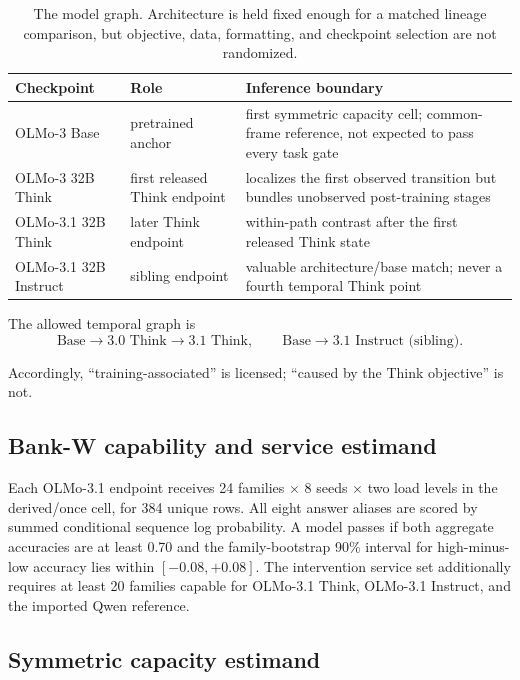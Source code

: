\documentclass[11pt]{article}
\begin{document}
\begin{table}[H]
\centering\small
\begin{tabularx}{\textwidth}{@{}p{}p{}X@{}}
\toprule
\textbf{Checkpoint} & \textbf{Role} & \textbf{Inference boundary}\\
\midrule
OLMo-3 Base & pretrained anchor & first symmetric capacity cell; common-frame
reference, not expected to pass every task gate\\
OLMo-3 32B Think & first released Think endpoint & localizes the first observed
transition but bundles unobserved post-training stages\\
OLMo-3.1 32B Think & later Think endpoint & within-path contrast after the first
released Think state\\
OLMo-3.1 32B Instruct & sibling endpoint & valuable architecture/base match;
never a fourth temporal Think point\\
\bottomrule
\end{tabularx}
\caption{The model graph. Architecture is held fixed enough for a matched
lineage comparison, but objective, data, formatting, and checkpoint selection
are not randomized.}
\end{table}

The allowed temporal graph is
\[
\text{Base}\longrightarrow\text{3.0 Think}\longrightarrow\text{3.1 Think},
\qquad
\text{Base}\longrightarrow\text{3.1 Instruct (sibling)}.
\]

Accordingly, ``training-associated'' is licensed; ``caused by the Think
objective'' is not.

\subsection{Bank-W capability and service estimand}

Each OLMo-3.1 endpoint receives 24 families $\times$ 8 seeds $\times$ two load
levels in the derived/once cell, for 384 unique rows. All eight answer aliases
are scored by summed conditional sequence log probability. A model passes if
both aggregate accuracies are at least 0.70 and the family-bootstrap 90\%
interval for high-minus-low accuracy lies within $[-0.08,+0.08]$. The
intervention service set additionally requires at least 20 families capable
for OLMo-3.1 Think, OLMo-3.1 Instruct, and the imported Qwen reference.

\subsection{Symmetric capacity estimand}
\end{document}
